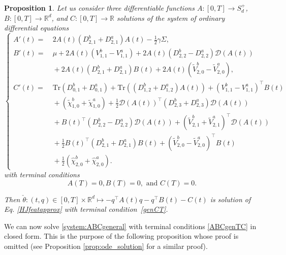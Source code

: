 \documentclass[preprint, 3p]{elsarticle}
\newcommand{\1}{{\chi}}
\newtheorem{proposition}{Proposition}
\begin{document}
\begin{proposition}
Let us consider three differentiable functions $A: [0,T] \to S_d^{+}$, $B: [0,T] \to \mathbb{R}^d$, and $C: [0,T] \to \mathbb R$ solutions of the system of ordinary differential equations
\begin{equation}\label{system:ABCgeneral}
\begin{cases}
\displaystyle
A'(t) =&\ 2A(t) \left(D^b_{2,1} + D^a_{2,1} \right) A(t)  - \frac 12 \gamma \Sigma , \\
B'(t) =&\ \mu + 2A(t) \left( {V^{b}_{1,1}} - {V^{a}_{1,1}} \right) + 2 A(t) \left(D^{b}_{2,2} - D^{a}_{2,2}  \right) \mathcal D (A(t)) \\
    &\ + 2 A(t) \left(D^{b}_{2,1} + D^{a}_{2,1} \right) B(t)  + 2 A(t) \left( {\tilde{V}^{b}_{2,0}} - {\tilde{V}^{a}_{2,0}} \right),\\
C'(t) = &\ \textrm{Tr}\left( D^b_{0,1} + D^a_{0,1} \right) +\textrm{Tr}\left(\left(D^b_{1,2} + D^a_{1,2}\right) A(t)\right)  + \left( {V^{b}_{1,1}} - {V^{a}_{1,1}} \right)^\intercal B(t)\\
    &\  + \left( \tilde{\chi}^{b}_{1,0} + \tilde{\chi}^{a}_{1,0} \right) + \frac 12 \mathcal{D}(A(t))^\intercal \left(D^b_{2,3} + D^a_{2,3}\right) \mathcal{D}(A(t))\\
    &\ + B(t)^\intercal \left(D^b_{2,2} - D^a_{2,2}\right) \mathcal{D}(A(t)) + \left( {\tilde{V}^{b}_{2,1}} + {\tilde{V }^{a}_{2,1}} \right)^\intercal \mathcal D(A(t)) \\
    &\  + \frac 12 B(t)^\intercal \left({D^{b}_{2,1}} + {D^{a}_{2,1}} \right) B(t)  + \left(  {\tilde{V}^{b}_{2,0}} - {\tilde{V}^{a}_{2,0}} \right)^\intercal B(t)  \\
&\  + \frac 12 \left(\hat{\chi}^{b}_{2,0} + \hat{\chi}^{a}_{2,0} \right).
\end{cases}
\end{equation}
with terminal conditions
\begin{equation}
\label{ABCgenTC}
    A(T) = 0, B(T) = 0, \textrm{ and } C(T)=0.
\end{equation}

Then $\check{\theta}: (t,q) \in [0,T] \times \mathbb R^d \mapsto -q^\intercal A(t) q - q^\intercal B(t) -  C(t)$ is solution of Eq. \eqref{HJfeatapprox} with terminal condition~\eqref{genCT}.
\end{proposition}

We can now solve \eqref{system:ABCgeneral} with terminal conditions \eqref{ABCgenTC} in closed form. This is the purpose of the following proposition whose proof is omitted (see Proposition \ref{prop:ode_solution} for a similar proof).\\
\end{document}
